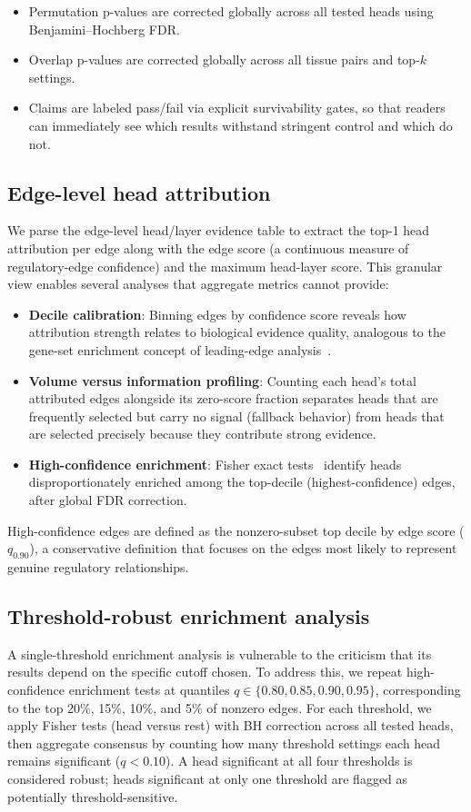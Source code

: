 \documentclass[11pt]{article}
\begin{document}
\begin{itemize}
\item Permutation p-values are corrected globally across all tested heads using Benjamini--Hochberg FDR.
\item Overlap p-values are corrected globally across all tissue pairs and top-$k$ settings.
\item Claims are labeled pass/fail via explicit survivability gates, so that readers can immediately see which results withstand stringent control and which do not.
\end{itemize}

\subsection{Edge-level head attribution}
We parse the edge-level head/layer evidence table to extract the top-1 head attribution per edge along with the edge score (a continuous measure of regulatory-edge confidence) and the maximum head-layer score. This granular view enables several analyses that aggregate metrics cannot provide:

\begin{itemize}
\item \textbf{Decile calibration}: Binning edges by confidence score reveals how attribution strength relates to biological evidence quality, analogous to the gene-set enrichment concept of leading-edge analysis~\cite{subramanian2005gsea}.
\item \textbf{Volume versus information profiling}: Counting each head's total attributed edges alongside its zero-score fraction separates heads that are frequently selected but carry no signal (fallback behavior) from heads that are selected precisely because they contribute strong evidence.
\item \textbf{High-confidence enrichment}: Fisher exact tests~\cite{fisher1922} identify heads disproportionately enriched among the top-decile (highest-confidence) edges, after global FDR correction.
\end{itemize}

High-confidence edges are defined as the nonzero-subset top decile by edge score ($q_{0.90}$), a conservative definition that focuses on the edges most likely to represent genuine regulatory relationships.

\subsection{Threshold-robust enrichment analysis}
A single-threshold enrichment analysis is vulnerable to the criticism that its results depend on the specific cutoff chosen. To address this, we repeat high-confidence enrichment tests at quantiles $q \in \{0.80, 0.85, 0.90, 0.95\}$, corresponding to the top 20\%, 15\%, 10\%, and 5\% of nonzero edges. For each threshold, we apply Fisher tests (head versus rest) with BH correction across all tested heads, then aggregate consensus by counting how many threshold settings each head remains significant ($q<0.10$). A head significant at all four thresholds is considered robust; heads significant at only one threshold are flagged as potentially threshold-sensitive.
\end{document}
